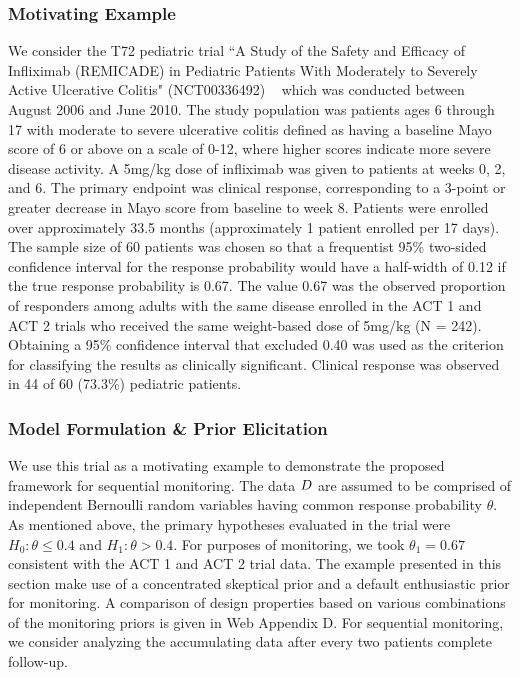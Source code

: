 \documentclass[AMA,STIX1COL,doublespace]{WileyNJD-v2}
\begin{document}
\subsubsection{Motivating Example}
We consider the T72 pediatric trial ``A Study of the Safety and Efficacy of Infliximab (REMICADE) in Pediatric Patients With Moderately to Severely Active Ulcerative Colitis" (NCT00336492) ~\citep{Hyams2012} which was conducted between August 2006 and June 2010.
%
The study population was patients ages 6 through 17 with moderate to severe ulcerative colitis defined as having a baseline Mayo score of 6 or above on a scale of 0-12, where higher scores indicate more severe disease activity.
%
A 5mg/kg dose of infliximab was given to patients at weeks 0, 2, and 6.
%
The primary endpoint was clinical response, corresponding to a 3-point or greater decrease in Mayo score from baseline to week 8. 
%
Patients were enrolled over approximately 33.5 months (approximately 1 patient enrolled per 17 days). 
%
The sample size of 60 patients was chosen so that a frequentist 95\% two-sided confidence interval for the response probability would have a half-width of 0.12 if the true response probability is 0.67.
%
The value 0.67 was the observed proportion of responders among adults with the same disease enrolled in the ACT 1 and ACT 2 trials \citep{Rutgeerts2005} who received the same weight-based dose of 5mg/kg (N = 242).
%
Obtaining a 95\% confidence interval that excluded 0.40 was used as the criterion for classifying the results as clinically significant.
%
Clinical response was observed in 44 of 60 (73.3\%) pediatric patients.

\subsubsection{Model Formulation \& Prior Elicitation}\label{sec:example1model} We use this trial as a motivating example to demonstrate the proposed 
framework for sequential monitoring. The data $\boldmath{D}$ are assumed to be comprised of independent Bernoulli random variables having common response 
probability $\theta$. 
%
As mentioned above, the primary hypotheses evaluated in the trial were $H_0:\theta \le 0.4$ and $H_1: \theta>0.4$.
%
For purposes of monitoring, we took $\theta_1=0.67$ consistent with the ACT 1 and ACT 2 trial data. 
%
The example presented in this section make use of a concentrated skeptical prior and a default enthusiastic prior for monitoring.
%
%
A comparison of design properties based on various combinations of the monitoring priors is given in Web Appendix D.
%
For sequential monitoring, we consider analyzing the accumulating data after every two patients complete follow-up.
\end{document}
